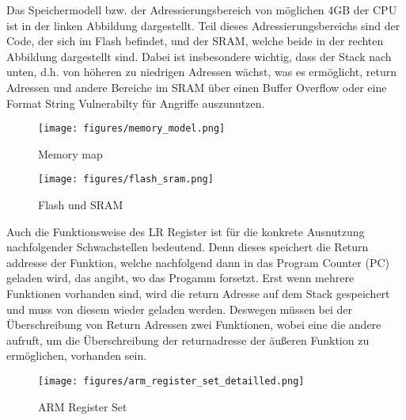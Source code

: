 \documentclass[a4paper,
DIV=13,
12pt,
BCOR=10mm,
department=FakIM,
oneside,
parskip=half,
automark,
listof=totocnumbered,
bibliography=totocnumbered,
acronym=totocnumbered
] {OTHRartcl}
\begin{document}
Das Speichermodell bzw. der Adressierungsbereich von möglichen 4GB der CPU ist in der linken Abbildung dargestellt.
Teil dieses Adressierungsbereichs sind der Code, der sich im Flash befindet, und der SRAM, welche beide in der rechten Abbildung dargestellt sind.
Dabei ist insbesondere wichtig, dass der Stack nach unten, d.h. von höheren zu niedrigen Adressen wächst, was es ermöglicht,
return Adressen und andere Bereiche im SRAM über einen Buffer Overflow oder eine Format String Vulnerabilty für Angriffe auszunutzen.
\begin{figure}[ht!]
  \begin{minipage}[b]{.45\linewidth}
    \texttt{[image: figures/memory\_model.png]}
    \caption{Memory map}
    \label{Abbildung 1: Memory map}
  \end{minipage}
  \hspace{.1\linewidth}
  \begin{minipage}[b]{.48\linewidth}
    \texttt{[image: figures/flash\_sram.png]}
    \caption{Flash und SRAM}
    \label{Abbildung 6: Flash und SRAM}
  \end{minipage}
\end{figure}

Auch die Funktionsweise des LR Register ist für die konkrete Ausnutzung nachfolgender Schwachstellen bedeutend.
Denn dieses speichert die Return addresse der Funktion, welche nachfolgend dann in das Program Counter (PC) geladen wird, das angibt, wo das Progamm forsetzt.
Erst wenn mehrere Funktionen vorhanden sind, wird die return Adresse auf dem Stack gespeichert und muss von
diesem wieder geladen werden. Deswegen müssen bei der Überschreibung von Return Adressen zwei Funktionen, wobei eine die andere aufruft, um die Überschreibung
der returnadresse der äußeren Funktion zu ermöglichen, vorhanden sein.
\begin{figure}[ht!]
\begin{center}
  \texttt{[image: figures/arm\_register\_set\_detailled.png]}
  \caption{ARM Register Set}
  \label{Abbildung 1: ARM Register Set}
\end{center}
\end{figure}


\end{document}
